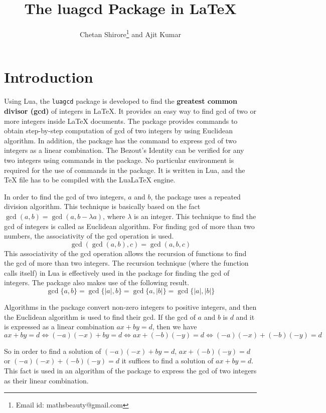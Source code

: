 \documentclass{article}
\begin{document}
\title{The luagcd Package in LaTeX}
\author{Chetan Shirore\thanks{Email id: mathsbeauty@gmail.com} \space and Ajit Kumar}
\maketitle
\section{Introduction}\label{section:introduction}
Using Lua, the \verb|luagcd| package is developed to find the \textbf{greatest common divisor (gcd)} of integers in LaTeX. It provides an easy way to find gcd of two or more integers inside LaTeX documents. The package provides commands to obtain step-by-step computation of gcd of two integers by using Euclidean algorithm. In addition, the package has the command to express gcd of two integers as a linear combination. The Bezout’s Identity can be verified for any two integers using commands in the package. No particular environment is required for the use of commands in the package. It is written in Lua, and the TeX file has to be compiled with the LuaLaTeX engine.

In order to find the gcd of two integers, \(a\) and \(b\), the package uses a repeated division algorithm. This technique is basically based on the fact \(\gcd(a,b)=\gcd(a,b-\lambda a)\), where \(\lambda\) is an integer. This technique to find the gcd of integers is called as Euclidean algorithm. For finding gcd of more than two numbers, the associativity of the gcd operation is used.
\[\gcd(\gcd(a,b),c)=\gcd(a,b,c)\]
This associativity of the gcd operation allows the recursion of functions to find the gcd of more than two integers. The recursion technique (where the function calls itself) in Lua is effectively used in the package for finding the gcd of integers. The package also makes use of the following result.
 \[\gcd\{a,b\}=\gcd\{|a|,b\}=\gcd\{a,|b|\}=\gcd\{|a|,|b|\} \]
 
 Algorithms in the package convert non-zero integers to positive integers, and then the Euclidean algorithm is used to find their gcd. If the gcd of \(a\) and \(b\) is \(d\)  and it is expressed as a linear combination \(ax+by=d\), then we have
 \[ax+by=d \iff (-a)(-x)+by = d \iff ax+(-b)(-y) = d \iff (-a)(-x)+(-b)(-y) = d \]

So in order to find a solution of \((-a)(-x)+by = d\), \( ax+(-b)(-y) = d\) or \((-a)(-x)+(-b)(-y) = d\)  it suffices to find a solution of \(ax+by=d \). This fact is used in an algorithm of the package to express the gcd of two integers as their linear combination.
\end{document}
